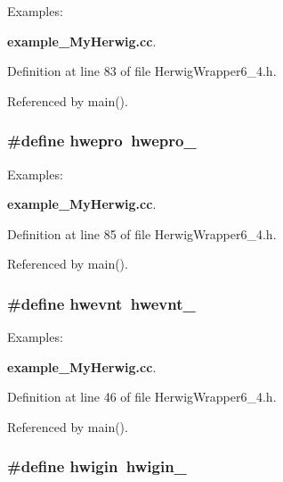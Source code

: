 \begin{Desc}
\item[Examples: ]\par
{\bf example\_\-My\-Herwig.cc}.\end{Desc}


Definition at line 83 of file Herwig\-Wrapper6\_\-4.h.

Referenced by main().
\subsubsection{\setlength{\rightskip}{0pt plus 5cm}\#define hwepro~hwepro\_\-}\label{HerwigWrapper6__4_8h_951056e320f4e2e80f9797bd7d011f88}


\begin{Desc}
\item[Examples: ]\par
{\bf example\_\-My\-Herwig.cc}.\end{Desc}


Definition at line 85 of file Herwig\-Wrapper6\_\-4.h.

Referenced by main().
\subsubsection{\setlength{\rightskip}{0pt plus 5cm}\#define hwevnt~{\bf hwevnt\_\-}}\label{HerwigWrapper6__4_8h_c6225da5179f34232299b0f010160943}


\begin{Desc}
\item[Examples: ]\par
{\bf example\_\-My\-Herwig.cc}.\end{Desc}


Definition at line 46 of file Herwig\-Wrapper6\_\-4.h.

Referenced by main().
\subsubsection{\setlength{\rightskip}{0pt plus 5cm}\#define hwigin~hwigin\_\-}\label{HerwigWrapper6__4_8h_3b3382dfdbce79ba7f96fe09ac77b322}


